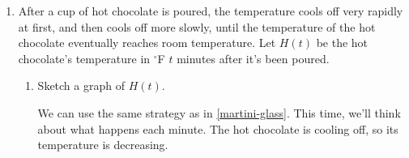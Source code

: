 \documentclass{article}
\begin{document}
\begin{enumerate}
\begin{solution}
\begin{center}
    \end{center}
    Since the glass keeps getting wider as we move up, each teaspoon
    will increase the height by less than the previous teaspoon.
    Therefore, if we keep plotting points in this way, we get a
    picture like this:
    \begin{center}
    \end{center}
    We haven't plotted what happens for every possible volume, but we can see enough of the trend to be sure that the correct graph is .
  \end{solution}

\item  \label{connally-2.5.14} 

  After a cup of hot chocolate is poured, the temperature cools off very rapidly at first, and then cools off more slowly, until the temperature of the hot chocolate eventually reaches room temperature. Let $H(t)$ be the hot chocolate's temperature in $^\circ$F $t$ minutes after it's been poured.

  \begin{enumerate}
  \item
    \begin{problem}[\stretch{0.75}]
      Sketch a graph of $H(t)$. 
    \end{problem}

    \begin{solution}
      We can use the same strategy as in \ref{martini-glass}. This time, we'll think about what happens each minute. The hot chocolate is cooling off, so its temperature is decreasing.


\end{solution}
\end{enumerate}
\end{enumerate}
\end{document}
